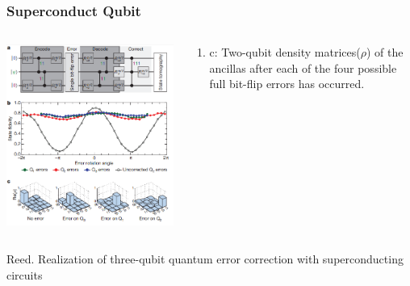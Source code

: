 \documentclass[aspectratio=169,10pt]{beamer}
\begin{document}
\begin{frame}
    \frametitle{Superconduct Qubit}
    \begin{columns}
        \begin{column}{0.45\textwidth}
            \centering
            \includegraphics[width=\columnwidth]{figure/qec3.png}
        \end{column}
        \begin{column}{0.55\textwidth}
            \centering
            \begin{block}{}
                \begin{enumerate}
                    \item c: Two-qubit density matrices($\rho$) of the ancillas after each of the four possible full bit-flip errors has occurred.
                \end{enumerate}
            \end{block}  
        \end{column}
    \end{columns}
\tiny{Reed. Realization of three-qubit quantum error correction with superconducting circuits}
\end{frame}
\end{document}
